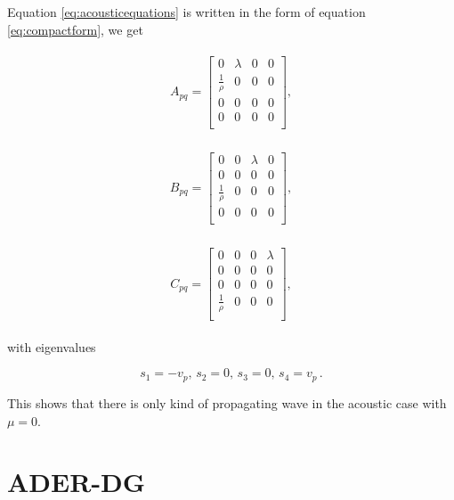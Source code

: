 Equation \ref{eq:acousticequations} is written in the form of equation \ref{eq:compactform}, we get 

\begin{align}
    \begin{split}
    A_{pq} = 
        \begin{bmatrix}
            0 & \lambda & 0 & 0 \\
            \frac{1}{\rho} & 0 & 0 & 0 \\
            0 & 0 & 0 & 0 \\
            0 & 0 & 0 & 0 \\
    \end{bmatrix},
    \end{split}
\end{align}

\begin{align}
    \begin{split}
    B_{pq} = 
        \begin{bmatrix}
            0 & 0 & \lambda & 0 \\
            0 & 0 & 0 & 0 \\
            \frac{1}{\rho} & 0 & 0 & 0\\
            0 & 0 & 0 & 0 \\
    \end{bmatrix},
    \end{split}
\end{align}

\begin{align}
    \begin{split}
    C_{pq} = 
        \begin{bmatrix}
            0 & 0 & 0 & \lambda \\
            0 & 0 & 0 & 0 \\
            0 & 0 & 0 & 0 \\
            \frac{1}{\rho} & 0 & 0 & 0 \\
    \end{bmatrix},
    \end{split}
\end{align}

with eigenvalues

\begin{equation}
    s_1 = -v_p, \, s_2 = 0, \, s_3 = 0, \, s_4 = v_p \, .
\end{equation}

This shows that there is only kind of propagating wave in the acoustic case with $\mu = 0$.
\section{\texorpdfstring{\ac{ADER}-\ac{DG}}{ADER-DG}}\label{section:ADER-DG}

